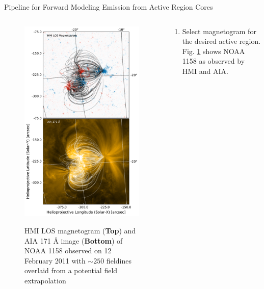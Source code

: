 \documentclass[final,12pt]{beamer}
\begin{document}
\begin{frame}
\begin{columns}[T]
\begin{column}{0.49\linewidth}
\begin{block}{Pipeline for Forward Modeling Emission from Active Region Cores}
\begin{columns}[c]
\begin{column}{0.33\columnwidth}
\begin{figure}
        \includegraphics{../figures/hmi_plus_aia_plus_lines.pdf}
        \label{fig:hmi_plus_aia}
        \caption{HMI LOS magnetogram (\textbf{Top}) and AIA 171 \AA\,\,image (\textbf{Bottom}) of NOAA 1158 observed on 12 February 2011 with $\sim250$ fieldines overlaid from a potential field extrapolation}
        \end{figure}
      \end{column}
      \begin{column}{0.65\columnwidth}
        \begin{enumerate}
          \item Select magnetogram for the desired active region. Fig. \ref{fig:hmi_plus_aia} shows NOAA 1158 as observed by HMI and AIA. 

\end{enumerate}
\end{column}
\end{columns}
\end{block}
\end{column}
\end{columns}
\end{frame}
\end{document}
